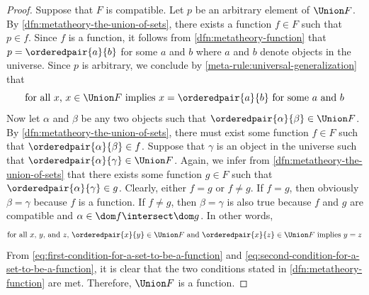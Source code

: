 \begin{proof}
    Suppose that \( F \) is compatible.
    Let \( p \) be an arbitrary element of \( \Union F \).
    By \cref{dfn:metatheory-the-union-of-sets}, there exists a function \( f \in F \) such that \( p \in f \).
    Since \( f \) is a function, it follows from \cref{dfn:metatheory-function} that \( p = \orderedpair{a}{b} \)
    for some \( a \) and \( b \) where \( a \) and \( b \) denote objects in the universe.
    Since \( p \) is arbitrary, we conclude by \cref{meta-rule:universal-generalization} that
    \begin{equation}
        \label{eq:first-condition-for-a-set-to-be-a-function}
        \text{for all \( x \), \( x \in \Union F \) implies \( x = \orderedpair{a}{b} \) for some \( a \) and \( b \)}
    \end{equation}
    Now let \( \alpha \) and \( \beta \) be any two objects such that \( \orderedpair{\alpha}{\beta} \in \Union F \).
    By \cref{dfn:metatheory-the-union-of-sets}, there must exist some function \( f \in F \) such that \( \orderedpair{\alpha}{\beta} \in f \).
    Suppose that \( \gamma \) is an object in the universe such that \( \orderedpair{\alpha}{\gamma} \in \Union F \).
    Again, we infer from \cref{dfn:metatheory-the-union-of-sets} that there exists some function \( g \in F \) such that
    \( \orderedpair{\alpha}{\gamma} \in g \). Clearly, either \( f = g \) or \( f \neq g \).
    If \( f = g \), then obviously \( \beta = \gamma \) because \( f \) is a function.
    If \( f \neq g \), then \( \beta = \gamma \) is also true because \( f \) and \( g \) are compatible and \( \alpha \in \dom f \intersect \dom g \).
    In other words,
    \begin{equation}
        \label{eq:second-condition-for-a-set-to-be-a-function}
        \text{for all \( x \), \( y \), and \( z \), \( \orderedpair{x}{y} \in \Union F \) and \( \orderedpair{x}{z} \in \Union F \) implies \( y = z \)}
    \end{equation}
    From \eqref{eq:first-condition-for-a-set-to-be-a-function} and \eqref{eq:second-condition-for-a-set-to-be-a-function}, it is clear that
    the two conditions stated in \cref{dfn:metatheory-function} are met. Therefore, \( \Union F \) is a function.


\end{proof}
